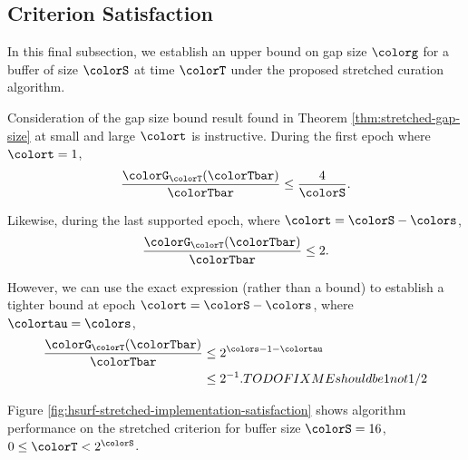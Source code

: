 \subsection{Criterion Satisfaction}

In this final subsection, we establish an upper bound on gap size $\colorg$ for a buffer of size $\colorS$ at time $\colorT$ under the proposed stretched curation algorithm.





Consideration of the gap size bound result found in Theorem \ref{thm:stretched-gap-size} at small and large $\colort$ is instructive.
During the first epoch where $\colort = 1$,
\begin{align*}
\frac{\colorG_{\colorT}(\colorTbar)}{\colorTbar}
\leq
\frac{4}{\colorS}.
\end{align*}

Likewise, during the last supported epoch, where $\colort = \colorS - \colors$,
\begin{align*}
\frac{\colorG_{\colorT}(\colorTbar)}{\colorTbar}
\leq
2.
\end{align*}

However, we can use the exact expression (rather than a bound) to establish a tighter bound at epoch $\colort = \colorS - \colors$, where $\colortau = \colors$,
\begin{align*}
\frac{\colorG_{\colorT}(\colorTbar)}{\colorTbar}
&\leq
2^{\colors - 1 - \colortau}\\
&\leq
2^{- 1}. TODO FIXME should be 1 not 1/2
\end{align*}

Figure \ref{fig:hsurf-stretched-implementation-satisfaction} shows algorithm performance on the stretched criterion for buffer size $\colorS=16$, $0 \leq \colorT < 2^{\colorS}$.

